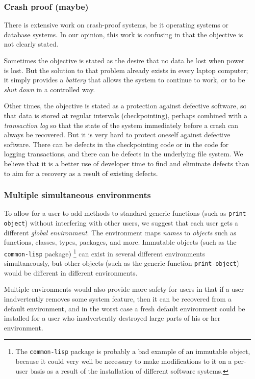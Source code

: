 \subsubsection{Crash proof (maybe)}

There is extensive work on crash-proof systems, be it operating
systems or database systems.  In our opinion, this work is
confusing in that the objective is not clearly stated.

Sometimes the objective is stated as the desire that no data be lost
when power is lost.  But the solution to that problem already exists
in every laptop computer; it simply provides a \emph{battery} that
allows the system to continue to work, or to be \emph{shut down} in a
controlled way. 

Other times, the objective is stated as a protection against
defective software, so that data is stored at regular intervals
(checkpointing), perhaps combined with a \emph{transaction log} so
that the state of the system immediately before a crash can always
be recovered.  But it is very hard to protect oneself against
defective software.  There can be defects in the checkpointing code
or in the code for logging transactions, and there can be defects in
the underlying file system.  We believe that it is a better use of
developer time to find and eliminate defects than to aim for a
recovery as a result of existing defects.

\subsubsection{Multiple simultaneous environments}

To allow for a user to add methods to standard generic functions (such
as \texttt{print-object}) without interfering with other users, we
suggest that each user gets a different \emph{global environment}.
The environment maps \emph{names} to \emph{objects} such as functions,
classes, types, packages, and more.  Immutable objects (such as the
\texttt{common-lisp} package)%
\footnote{The \texttt{common-lisp} package is probably a bad example
  of an immutable object, because it could very well be necessary to
  make modifications to it on a per-user basis as a result of the
  installation of different software systems.}
can exist in several different
environments simultaneously, but other objects (such as the generic
function \texttt{print-object}) would be different in different
environments.

Multiple environments would also provide more safety for users in
that if a user inadvertently removes some system feature, then it
can be recovered from a default environment, and in the worst case a
fresh default environment could be installed for a user who
inadvertently destroyed large parts of his or her environment. 

